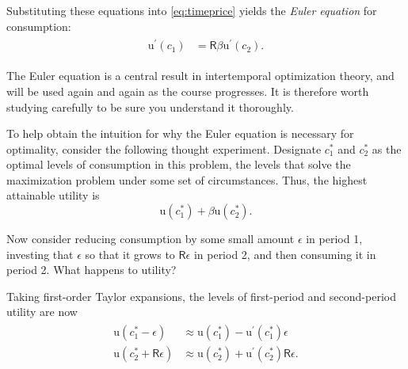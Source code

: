 \documentclass{scrartcl}
\begin{document}
  Substituting these equations into \eqref{eq:timeprice} yields the \textit{Euler equation} for consumption:
  \begin{equation}\begin{gathered}\begin{aligned} \mathrm{u}^{\prime}(\boldsymbol{\mathit{c}}_{1}) & = \mathsf{R} \beta \mathrm{u}^{\prime}(\boldsymbol{\mathit{c}}_{2}). \label{eq:euler}
      \end{aligned}\end{gathered}\end{equation}

  The Euler equation is a central result in intertemporal optimization theory, and will be used again and again as the course progresses.  It is therefore worth studying carefully to be sure you understand it thoroughly.

  To help obtain the intuition for why the Euler equation is necessary for optimality, consider the following thought experiment.  Designate $\boldsymbol{\mathit{c}}^{*}_{1}$ and $\boldsymbol{\mathit{c}}^{*}_{2}$ as the optimal levels of consumption in this problem, the levels that solve the maximization problem under some set of circumstances.  Thus, the highest attainable utility is
  \begin{equation} \mathrm{u}(\boldsymbol{\mathit{c}}_{1}^{*})+\beta \mathrm{u}(\boldsymbol{\mathit{c}}_{2}^{*}) \label{eq:maxutil}.
  \end{equation}

  Now consider reducing consumption by some small amount $\epsilon$ in period 1, investing that $\epsilon$ so that it grows to $\mathsf{R} \epsilon$ in period 2, and then consuming it in period 2.  What happens to utility?

  Taking first-order Taylor expansions, the levels of first-period and second-period utility are now
  \begin{equation}\begin{gathered}\begin{aligned} \mathrm{u}(\boldsymbol{\mathit{c}}_{1}^{*}-\epsilon) & \approx \mathrm{u}(\boldsymbol{\mathit{c}}_{1}^{*})-\mathrm{u}^{\prime}(\boldsymbol{\mathit{c}}_{1}^{*})\epsilon \\ \mathrm{u}(\boldsymbol{\mathit{c}}_{2}^{*}+\mathsf{R}\epsilon) & \approx \mathrm{u}(\boldsymbol{\mathit{c}}_{2}^{*})+\mathrm{u}^{\prime}(\boldsymbol{\mathit{c}}_{2}^{*})\mathsf{R}\epsilon.
      \end{aligned}\end{gathered}\end{equation}
\end{document}
